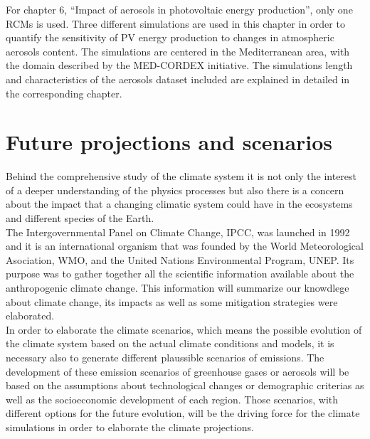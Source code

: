 For chapter 6, ``Impact of aerosols in photovoltaic energy production'', only one RCMs is used. Three different simulations are used in this chapter in order to quantify the sensitivity of PV energy production to changes in atmospheric aerosols content. The simulations are centered in the Mediterranean area, with the domain described by the MED-CORDEX initiative. The simulations length and characteristics of the aerosols dataset included are explained in detailed in the corresponding chapter.\\



\section{Future projections and scenarios}

Behind the comprehensive study of the climate system it is not only the interest of a deeper understanding of the physics processes but also there is a concern about the impact that a changing climatic system could have in the ecosystems and different species of the Earth.\\ 

The Intergovernmental Panel on Climate Change, IPCC, was launched in 1992 and it is an international organism that was founded by the World Meteorological Asociation, WMO, and the United Nations Environmental Program, UNEP. Its purpose was to gather together all the scientific information available about the anthropogenic climate change. This information will summarize our knowdlege about climate change, its impacts as well as some mitigation strategies were elaborated.\\

In order to elaborate the climate scenarios, which means the possible evolution of the climate system based on the actual climate conditions and models, it is necessary also to generate different plaussible scenarios of emissions. The development of these emission scenarios of greenhouse gases or aerosols will be based on the assumptions about technological changes or demographic criterias as well as the socioeconomic development of each region. Those scenarios, with different options for the future evolution, will be the driving force for the climate simulations in order to elaborate the climate projections.\\

